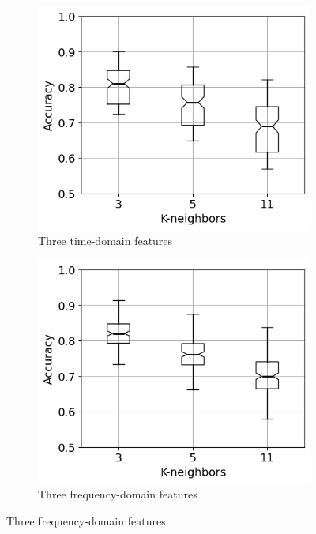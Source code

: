 \begin{figure}[h]
    \centering
    \begin{subfigure}[b]{0.48\textwidth}
        \includegraphics[width=\textwidth]{assets/results/feature-combinations/TD-3-A-False-False-F3.png}
        \caption{Three time-domain features}
    \end{subfigure}
    \hfill
    \begin{subfigure}[b]{0.48\textwidth}
        \includegraphics[width=\textwidth]{assets/results/feature-combinations/FD-3-A-False-False-F3.png}
        \caption{Three frequency-domain features}

\end{subfigure}
\end{figure}
